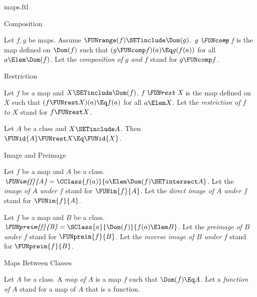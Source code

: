\documentclass{stex}
\begin{document}
\begin{smodule}{maps.ftl}
\begin{sfragment}{Composition}
  \begin{definition}[forthel]
    Let $f, g$ be maps.
    Assume $\FUNrange(f) \SETinclude \Dom(g)$.
    $\emph{g \FUNcomp f}$ is the map defined on $\Dom(f)$ such that $(g \FUNcomp f)(a) \Eq g(f(a))$ for all $a \Elem \Dom(f)$.
    Let the \emph{composition of $g$ and $f$} stand for $g \FUNcomp f$.
  \end{definition}
\end{sfragment}

\begin{sfragment}{Restriction}
  \begin{definition}[forthel]
    Let $f$ be a map and $X \SETinclude \Dom(f)$.
    $\emph{f \FUNrest X}$ is the map defined on $X$ such that $(f \FUNrest X)(a) \Eq f(a)$ for all $a \Elem X$.
    Let the \emph{restriction of $f$ to $X$} stand for $f \FUNrest X$.
  \end{definition}

  \begin{proposition}[forthel]
    Let $A$ be a class and $X \SETinclude A$.
    Then $\FUNid{A} \FUNrest X \Eq \FUNid{X}$.
  \end{proposition}
\end{sfragment}

\begin{sfragment}{Image and Preimage}
  \begin{definition}[forthel]
    Let $f$ be a map and $A$ be a class.
    $\emph{\FUNim{f}{A}} = \CClass{f(a)}{a \Elem \Dom(f) \SETintersect A}$.
    Let the \emph{image of $A$ under $f$} stand for $\FUNim{f}{A}$.
    Let the \emph{direct image of $A$ under $f$} stand for $\FUNim{f}{A}$.
  \end{definition}

  \begin{definition}[forthel]
    Let $f$ be a map and $B$ be a class.
    $\emph{\FUNpreim{f}{B}} = \SClass{a}{\Dom(f)}{f(a) \Elem B}$.
    Let the \emph{preimage of $B$ under $f$} stand for $\FUNpreim{f}{B}$.
    Let the \emph{inverse image of $B$ under $f$} stand for $\FUNpreim{f}{B}$.
  \end{definition}
\end{sfragment}

\begin{sfragment}{Maps Between Classes}
  \begin{definition}[forthel]
    Let $A$ be a class.
    A \emph{map of $A$} is a map $f$ such that $\Dom(f) \Eq A$.
    Let a \emph{function of $A$} stand for a map of $A$ that is a function.
  \end{definition}


\end{sfragment}
\end{smodule}
\end{document}

